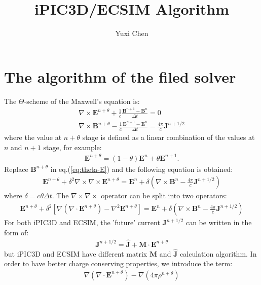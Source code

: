 \documentclass[a4paper, 11pt]{article}
\author{Yuxi Chen}
\title{iPIC3D/ECSIM Algorithm}
\begin{document}
\maketitle
\newpage

\section{The algorithm of the filed solver}
The $\Theta$-scheme of the Maxwell's equation is:
\begin{eqnarray}
\nabla \times \mathbf{E}^{n+\theta} + \frac{1}{c}\frac{\mathbf{B}^{n+1}-\mathbf{B}^{n}}{\Delta t} = 0
\label{eq:theta-B}\\
\nabla \times \mathbf{B}^{n+\theta} - \frac{1}{c}\frac{\mathbf{E}^{n+1}-\mathbf{E}^{n}}{\Delta t} = \frac{4\pi}{c} \mathbf{J}^{n+1/2}
\label{eq:theta-E}
\end{eqnarray}
where the value at $n+\theta$ stage is defined as a linear combination of the values at $n$ and $n+1$ stage, for example:
\begin{eqnarray}
\mathbf{E}^{n+\theta} = (1-\theta)\mathbf{E}^{n} + \theta\mathbf{E}^{n+1}.
\label{eq:theta}
\end{eqnarray}
Replace $\mathbf{B}^{n+\theta}$ in eq.(\ref{eq:theta-E}) and the following equation is obtained:
\begin{eqnarray}
\mathbf{E}^{n+\theta} + \delta^2 \nabla \times \nabla \times \mathbf{E}^{n+\theta} = \mathbf{E}^{n} + \delta(\nabla \times \mathbf{B}^n - \frac{4\pi}{c}\mathbf{J}^{n+1/2})
\label{eq:E1}
\end{eqnarray}
where $\delta = c \theta \Delta t$. The $\nabla \times \nabla \times$ operator can be split into two operators:
\begin{eqnarray}
\mathbf{E}^{n+\theta} + \delta^2 \left[ \nabla(\nabla \cdot \mathbf{E}^{n+\theta}) - \nabla ^2 \mathbf{E}^{n+\theta}\right] = \mathbf{E}^{n} + \delta(\nabla \times \mathbf{B}^n - \frac{4\pi}{c}\mathbf{J}^{n+1/2})
\label{eq:E2}
\end{eqnarray}
For both iPIC3D and ECSIM, the 'future' current $\mathbf{J}^{n+1/2}$ can be written in the form of:
\begin{eqnarray}
\mathbf{J}^{n+1/2} = \hat{\mathbf{J}} + \mathbf{M} \cdot \mathbf{E}^{n+\theta}
\label{eq: J}
\end{eqnarray}
but iPIC3D and ECSIM have different matrix $\mathbf{M}$ and $\hat{\mathbf{J}}$ calculation algorithm.
In order to have better charge conserving properties, we introduce the term:
\begin{eqnarray}
\nabla (\nabla \cdot \mathbf{E}^{n+\theta}) - \nabla (4\pi \rho ^{n+\theta})
\label{eq:divE}
\end{eqnarray}
\end{document}
